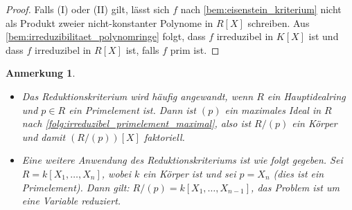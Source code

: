 \documentclass[a4paper, twoside, 11pt, ngerman]{report}
\theoremstyle{definistyle}
\newtheorem{anm}[satz]{Anmerkung}
\theoremstyle{remark}
\begin{document}
\begin{proof}
Falls (I) oder (II) gilt, lässt sich $f$ nach \ref{bem:eisenstein_kriterium} nicht als Produkt zweier nicht-konstanter Polynome in $R[X]$ schreiben. Aus \ref{bem:irreduzibilitaet_polynomringe} folgt, dass $f$ irreduzibel in $K[X]$ ist und dass $f$ irreduzibel in $R[X]$ ist, falls $f$ prim ist.
\end{proof}

\begin{anm}\label{anm:reduktionskriterium_hir}
\begin{itemize}
\item Das Reduktionskriterium wird häufig angewandt, wenn $R$ ein Hauptidealring und $p\in R$ ein Primelement ist. Dann ist $(p)$ ein maximales Ideal in $R$ nach \ref{folg:irreduzibel_primelement_maximal}, also ist $R / (p)$ ein Körper und damit $(R /(p))[X]$ faktoriell.
\item Eine weitere Anwendung des Reduktionskriteriums ist wie folgt gegeben. Sei $R = k[X_1, \dots, X_n]$, wobei $k$ ein Körper ist und sei $p = X_n$ (dies ist ein Primelement). Dann gilt: $R / (p) = k[X_1, \dots, X_{n-1}]$, das Problem ist um eine Variable reduziert.

\end{itemize}
\end{anm}
\end{document}
